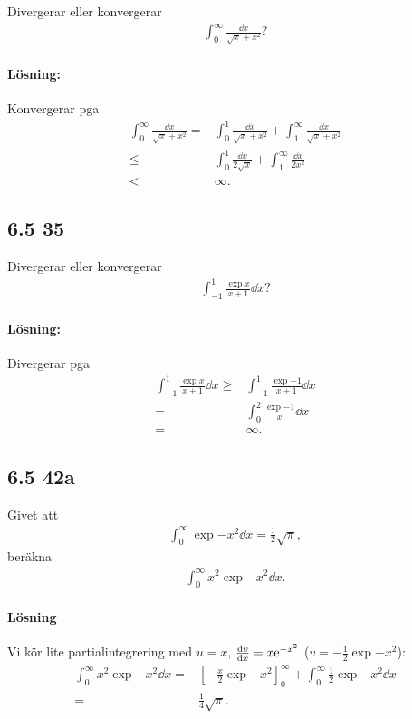 Divergerar eller konvergerar
\begin{align*}
	\int_0^\infty \frac{\dd{x}}{\sqrt{x} + x^2}?
\end{align*}

\paragraph{Lösning:}

Konvergerar pga
\begin{align*}
	\int_0^\infty \frac{\dd{x}}{\sqrt{x} + x^2}
	={}& \int_0^1 \frac{\dd{x}}{\sqrt{x} + x^2}
	+ \int_1^\infty \frac{\dd{x}}{\sqrt{x} + x^2}\\
	\leq{}& \int_0^1 \frac{\dd{x}}{2 \sqrt{x}}
	+ \int_1^\infty \frac{\dd{x}}{2 x^2} \\
	<{}& \infty.
\end{align*}


\subsection{6.5 35}%
\label{sub:6_5_35}

Divergerar eller konvergerar
\begin{align*}
	\int_{-1}^{1} \frac{\exp{x}}{x + 1} \dd{x}?
\end{align*}

\paragraph{Lösning:}

Divergerar pga
\begin{align*}
	\int_{-1}^{1} \frac{\exp{x}}{x + 1} \dd{x} \geq{}& \int_{-1}^{1} \frac{\exp{-1}}{x + 1} \dd{x}\\
	={}& \int_{0}^{2} \frac{\exp{-1}}{x} \dd{x}\\
	={}& \infty.
\end{align*}


\subsection{6.5 42a}%
\label{sub:6_5_42a}

Givet att
\begin{align*}
	\int_0^\infty \exp{-x^2} \dd{x} = \frac{1}{2} \sqrt{\pi},
\end{align*}
beräkna
\begin{align*}
	\int_0^\infty x^2 \exp{-x^2} \dd{x}.
\end{align*}

\paragraph{Lösning}

Vi kör lite partialintegrering med $u = x$, $\derivative{v}{x} = x \exp{-x^2}$ ($v = -\frac{1}{2} \exp{-x^2}$):
\begin{align*}
	\int_0^\infty x^2 \exp{-x^2} \dd{x} ={}& [-\frac{x}{2} \exp{-x^2}]_0^\infty + \int_0^\infty \frac{1}{2} \exp{-x^2} \dd{x}\\
	={}& \frac{1}{4} \sqrt{\pi}.
\end{align*}


